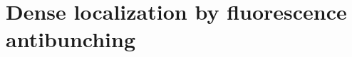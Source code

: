 \documentclass{beamer}					%
\begin{document}
\section{Dense localization by fluorescence antibunching}

\end{document}

